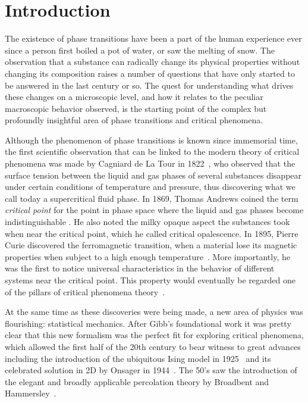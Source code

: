 \chapter{Introduction}
\label{ch:intr}

The existence of phase transitions have been a part of the human experience
ever since a person first boiled a pot of water, or saw the melting of snow.
The observation that a substance can radically change its physical properties
without changing its composition raises a number of questions that have only
started to be answered in the last century or so. The quest for understanding
what drives these changes on a microscopic level, and how it relates to the
peculiar macroscopic behavior observed, is the starting point of the complex
but profoundly insightful area of phase transitions and critical phenomena.

Although the phenomenon of phase transitions is known since immemorial time,
the first scientific observation that can be linked to the modern theory of
critical phenomena was made by Cagniard de La Tour in 1822~\cite{delaTour1822},
who observed that the surface tension between the liquid and gas phases of
several substances disappear under certain conditions of temperature and
pressure, thus discovering what we call today a supercritical fluid phase. In
1869, Thomas Andrews coined the term \textit{critical point} for the point in
phase space where the liquid and gas phases become indistinguishable
\cite{Andrews1869}. He also noted the milky opaque aspect the substances took
when near the critical point, which he called critical opalescence. In 1895,
Pierre Curie discovered the ferromagnetic transition, when a material lose its
magnetic properties when subject to a high enough temperature~\cite{Curie1895}.
More importantly, he was the first to notice universal characteristics in the
behavior of different systems near the critical point. This property would
eventually be regarded one of the pillars of critical phenomena
theory~\cite{Stanley1999}.

At the same time as these discoveries were being made, a new area of physics
was flourishing: statistical mechanics. After Gibb's foundational work
\cite{Gibbs1906} it was pretty clear that this new formalism was the perfect
fit for exploring critical phenomena, which allowed the first half of the 20th
century to bear witness to great advances including the introduction of the
ubiquitous Ising model in 1925~\cite{Ising1925} and its celebrated solution in
2D by Onsager in 1944~\cite{Onsager1944}. The 50's saw the introduction of the
elegant and broadly applicable percolation theory by Broadbent and
Hammersley~\cite{Broadbent1957}.

